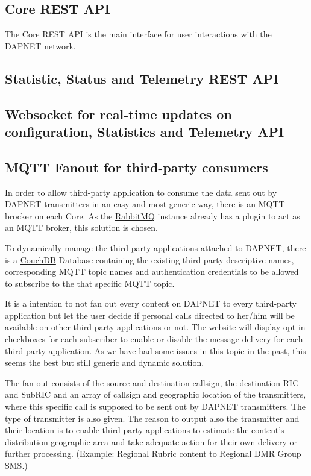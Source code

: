 \subsection{Core REST API}
\label{dapnetdef:corerestapi}
The Core REST API is the main interface for user interactions with the DAPNET network.

\subsection{Statistic, Status and Telemetry REST API}
\label{dapnetdef:statisticstatustelemetry}


\subsection{Websocket for real-time updates on configuration, Statistics and Telemetry API}
\label{dapnetdef:websocket}

\subsection{MQTT Fanout for third-party consumers}
\label{dapnetdef:mqttfanout}
In order to allow third-party application to consume the data sent out by DAPNET
transmitters in an easy and most generic way, there is an MQTT brocker on each
Core. As the \hyperref[dapnetdef:clusterdesc:rabbitmq]{RabbitMQ} instance
already has a plugin to act as an MQTT broker, this solution is chosen.

To dynamically manage the third-party applications attached to DAPNET, there is
a \hyperref[dapnetdef:clusterdesc:couchdb]{CouchDB}-Database containing the
existing third-party descriptive names, corresponding MQTT topic names and
authentication credentials to be allowed to subscribe to the that specific MQTT
topic.

It is a intention to not fan out every content on DAPNET to every third-party
application but let the user decide if personal calls directed to her/him will
be available on other third-party applications or not. The website will display
opt-in checkboxes for each subscriber to enable or disable the message delivery
for each third-party application. As we have had some issues in this topic in
the past, this seems the best but still generic and dynamic solution.

The fan out consists of the source and destination callsign, the destination RIC
and SubRIC and an array of callsign and geographic location of the transmitters,
where this specific call is supposed to be sent out by DAPNET transmitters. The
type of transmitter is also given. The reason to output also the transmitter and
their location is to enable third-party applications to estimate the content's
distribution geographic area and take adequate action for their own delivery or
further processing. (Example: Regional Rubric content to Regional DMR Group
SMS.)

